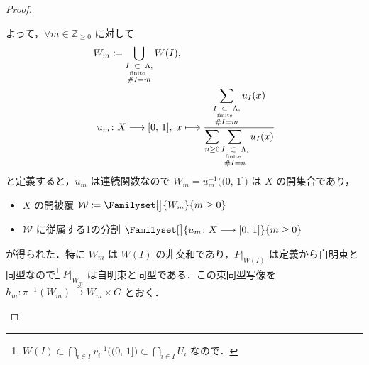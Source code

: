 \documentclass[TQFT_main]{subfiles}
\begin{document}
\begin{proof}
\begin{description}
\begin{description}
            よって，$\forall m \in \mathbb{Z}_{\ge 0}$ に対して
            \begin{align}
                W_m &\coloneqq \bigcup_{\substack{I \underset{\text{finite}}{\subset} \Lambda, \\ \# I = m}} W(I),\\
                u_m &\colon X \longrightarrow [0,\, 1],\; x \longmapsto \frac{\displaystyle\sum_{\substack{I \underset{\text{finite}}{\subset} \Lambda, \\ \# I = m}} u_I(x)}{\displaystyle\sum_{n \ge 0} \sum_{\substack{I \underset{\text{finite}}{\subset} \Lambda, \\ \# I = n}} u_I(x)}
            \end{align}
            と定義すると，$u_m$ は連続関数なので $W_m = u_m^{-1} \bigl( (0,\, 1] \bigr)$ は $X$ の開集合であり，
            \begin{itemize}
                \item $X$ の開被覆 $\mathcal{W} \coloneqq \Familyset[\big]{W_m}{m \ge 0}$
                \item $\mathcal{W}$ に従属する1の分割 $\Familyset[\big]{u_m \colon X \lto [0,\, 1]}{m \ge 0}$
            \end{itemize}
            が得られた．特に $W_m$ は $W(I)$ の非交和であり，$P|_{W(I)}$ は定義から自明束と同型なので\footnote{$W(I) \subset \bigcap_{i \in I} v_i^{-1}\bigl( (0,\, 1] \bigr) \subset \bigcap_{i \in I} U_i$ なので．} $P|_{W_m}$ は自明束と同型である．この束同型写像を $h_m \colon \pi^{-1}(W_m)\xrightarrow{\approx} W_m \times G$ とおく．


\end{description}
\end{description}
\end{proof}
\end{document}
